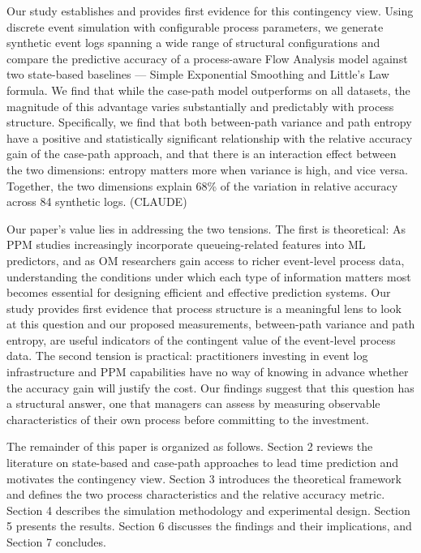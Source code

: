 \documentclass[
]{ceurart}
\begin{document}
Our study establishes and provides first evidence for this contingency view. Using discrete event simulation with configurable process parameters, 
we generate synthetic event logs spanning a wide range of structural configurations and compare the predictive accuracy of a process-aware 
Flow Analysis model against two state-based baselines — Simple Exponential Smoothing and Little's Law formula. We find that while the case-path model 
outperforms on all datasets, the magnitude of this advantage varies substantially and predictably with process structure. Specifically, 
we find that both between-path variance and path entropy have a positive and statistically significant relationship with the 
relative accuracy gain of the case-path approach, and that there is an interaction effect between the two dimensions: entropy matters 
more when variance is high, and vice versa. Together, the two dimensions explain 68\% of the variation in relative accuracy across 84 synthetic logs. (CLAUDE)

Our paper's value lies in addressing the two tensions. The first is theoretical: As PPM studies increasingly incorporate queueing-related features into ML predictors, and as OM researchers gain access to richer event-level process data, understanding the conditions 
under which each type of information matters most becomes essential for designing efficient and effective prediction systems. Our study provides first evidence that process structure is a meaningful lens to look at this question and our proposed measurements, 
between-path variance and path entropy, are useful indicators of the contingent value of the event-level process data.
The second tension is practical: practitioners investing in event log infrastructure and PPM capabilities have no way of knowing in advance whether the accuracy gain will justify the cost. Our findings suggest that this question has a structural answer, one that 
managers can assess by measuring observable characteristics of their own process before committing to the investment.

The remainder of this paper is organized as follows. Section 2 reviews the literature on state-based and case-path approaches 
to lead time prediction and motivates the contingency view. Section 3 introduces the theoretical framework and defines the two process 
characteristics and the relative accuracy metric. Section 4 describes the simulation methodology and experimental design. 
Section 5 presents the results. Section 6 discusses the findings and their implications, and Section 7 concludes.
\end{document}
